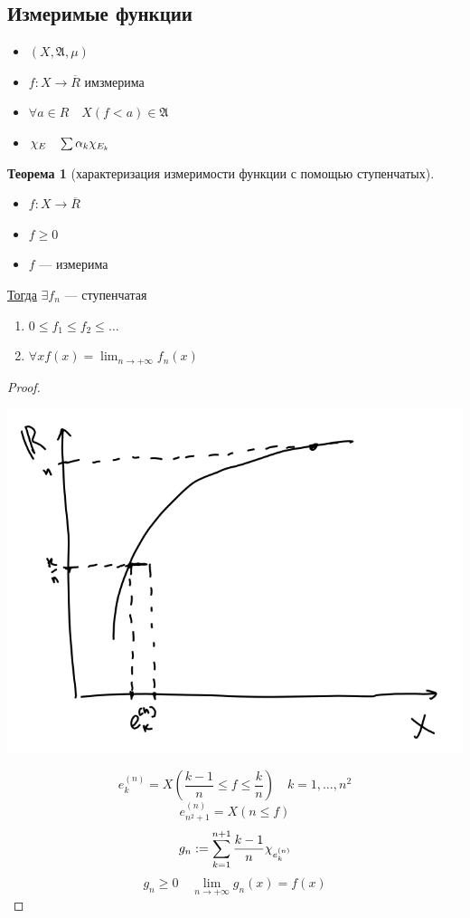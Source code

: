 \documentclass[oneside]{book}
\newcommand{\A}{\mathfrak{A}}
\theoremstyle{plain}
\theoremstyle{remark}
\theoremstyle{definition}
\newtheorem{theorem}{Теорема}[section]
\begin{document}
\subsection{Измеримые функции}
\label{sec:orga7de7b4}
\begin{itemize}
\item \((X, \A, \mu)\)
\item \(f: X \to \overline{R}\) имзмерима
\item \(\forall a \in R\quad X(f < a) \in \A\)
\item \(\chi_E\quad \sum \alpha_k \chi_{E_k}\)
\end{itemize}
\begin{theorem}[характеризация измеримости функции с помощью ступенчатых]
\-
\begin{itemize}
\item \(f: X \to \overline{R}\)
\item \(f \ge 0\)
\item \(f\) --- измерима
\end{itemize}
\uline{Тогда} \(\exists f_n\) --- ступенчатая
\begin{enumerate}
\item \(0 \le f_1 \le f_2 \le \dots\)
\item \(\forall x f(x) = \lim_{n \to + \infty}f_n(x)\)
\end{enumerate}
\label{orga36c50e}
\end{theorem}
\begin{proof}
\begin{center}
\includegraphics[scale=0.5]{2_1.png}
\end{center}
\[ e^{(n)}_k = X(\frac{k - 1}{n} \le f \le \frac{k}{n}) \quad k = 1,\dots,n^2 \]
\[ e^{(n)}_{n^2 + 1} = X(n \le f) \]
\[ g_n := \sum^{n + 1}_{k = 1} \frac{k - 1}{n} \chi_{e^{(n)}_k} \]
\[ g_n \ge 0 \quad \lim_{n \to + \infty}g_n(x) = f(x) \]
\label{org322b387}
\end{proof}
\end{document}

